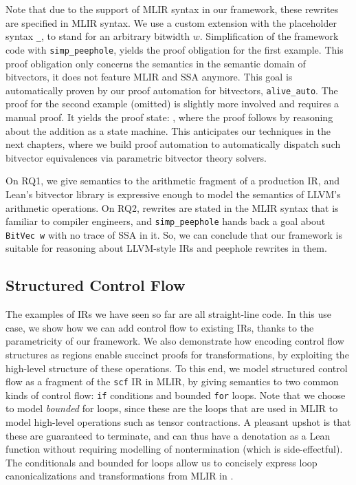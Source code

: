 \vspace{1em}
Note that due to the support of MLIR syntax in our framework, these rewrites are specified in MLIR syntax.
We use a custom extension with the placeholder syntax \texttt{\_}, to stand for an arbitrary bitwidth $w$.
Simplification of the framework code with \texttt{simp\_peephole}, yields the proof obligation
\noindent {}
for the first example.
This proof obligation only concerns the semantics in the semantic domain of bitvectors, it does not feature MLIR and SSA anymore.
This goal is automatically proven by our proof automation for bitvectors, \texttt{alive\_auto}.
The proof for the second example (omitted) is slightly more involved and requires a manual proof.
It yields the proof state: \noindent {},
where the proof follows by reasoning about the addition as a state machine.
This anticipates our techniques in the next chapters,
where we build proof automation to automatically dispatch such bitvector equivalences
via parametric bitvector theory solvers.

On RQ1, we give semantics to the arithmetic fragment of a production IR,
and Lean's bitvector library is expressive enough to model the semantics of LLVM's arithmetic operations.
On RQ2, rewrites are stated in the MLIR syntax that is familiar to compiler engineers,
and \texttt{simp\_peephole} hands back a goal about \texttt{BitVec w} with no
trace of SSA in it. So, we can conclude that our framework is suitable for reasoning about LLVM-style IRs
and peephole rewrites in them.


\subsection{Structured Control Flow}
\label{sec:mlir:structured-control-flow}

The examples of IRs we have seen so far are all straight-line code.
In this use case, we show how we can add control flow to existing IRs, thanks to the parametricity of our framework.
We also demonstrate how encoding control flow structures as regions enable succinct proofs for transformations, by exploiting the high-level structure of these operations.
To this end, we model structured control flow as a fragment of the \texttt{scf} IR in MLIR, by giving semantics to two common kinds of control flow:
\texttt{if} conditions and bounded \texttt{for} loops.
Note that we choose to model \emph{bounded} for loops, since these are the loops that are used in MLIR to model high-level operations such as tensor contractions.
A pleasant upshot is that these are guaranteed to terminate, and can thus have a denotation as a Lean function without requiring modelling of nontermination (which is side-effectful).
The conditionals and bounded for loops allow us to concisely express loop canonicalizations and transformations from MLIR in .

